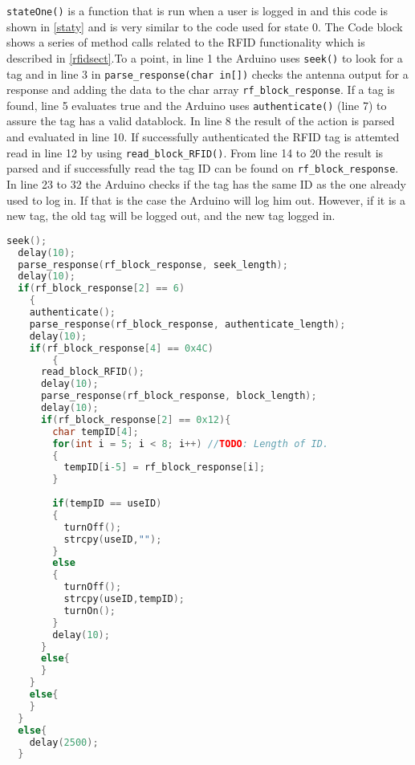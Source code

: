 \verb|stateOne()| is a function that is run when a user is logged in and this code is shown in \autoref{staty} and is very similar to the code used for state 0.
The Code block shows a series of method calls related to the RFID functionality which is described in \autoref{rfidsect}.\newline To a point, in line 1 the Arduino uses \verb|seek()| to look for a tag and in line 3 in \verb|parse_response(char in[])| checks the antenna output for a response and adding the data to the char array \verb|rf_block_response|. 
If a tag is found, line 5 evaluates true and the Arduino uses \verb|authenticate()| (line 7) to assure the tag has a valid datablock.
In line 8 the result of the action is parsed and evaluated in line 10. If successfully authenticated the RFID tag is attemted read in line 12 by using \verb|read_block_RFID()|. From line 14 to 20 the result is parsed and if successfully read the tag ID can be found on \verb|rf_block_response|.\newline
In line 23 to 32 the Arduino checks if the tag has the same ID as the one already used to log in. If that is the case the Arduino will log him out. However, if it is a new tag, the old tag will be logged out, and the new tag logged in.
\begin{lstlisting}[frame=single, language=C, label=staty, caption=The Arduino state one code.]
  seek();
  delay(10);
  parse_response(rf_block_response, seek_length);
  delay(10);
  if(rf_block_response[2] == 6)
	{
    authenticate();
    parse_response(rf_block_response, authenticate_length);
    delay(10);
    if(rf_block_response[4] == 0x4C)
		{
      read_block_RFID();
      delay(10);
      parse_response(rf_block_response, block_length);
      delay(10);
      if(rf_block_response[2] == 0x12){
        char tempID[4];
        for(int i = 5; i < 8; i++) //TODO: Length of ID.
        {        
          tempID[i-5] = rf_block_response[i];
        } 
        
        if(tempID == useID)
        {
          turnOff();
          strcpy(useID,"");
        }
        else
        {
          turnOff();
          strcpy(useID,tempID);
          turnOn();
        }
        delay(10);
      }
      else{
      }
    }
    else{
    }
  }
  else{ 
    delay(2500);
  }
\end{lstlisting}